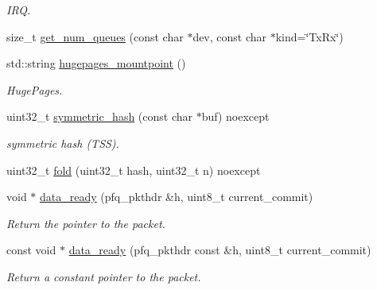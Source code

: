 \begin{DoxyCompactItemize}
\begin{DoxyCompactList}\small\item\em I\+R\+Q. \end{DoxyCompactList}\item 
size\+\_\+t \hyperlink{namespacepfq_a35dc28fdd850e9c82f1f3861cce2f9cb}{get\+\_\+num\+\_\+queues} (const char $\ast$dev, const char $\ast$kind=\char`\"{}Tx\+Rx\char`\"{})
\item 
std\+::string \hyperlink{namespacepfq_a46be800e747d99af1db9b92a8f296930}{hugepages\+\_\+mountpoint} ()
\begin{DoxyCompactList}\small\item\em Huge\+Pages. \end{DoxyCompactList}\item 
uint32\+\_\+t \hyperlink{namespacepfq_acd3646943e133a2651876f9ca0bd154c}{symmetric\+\_\+hash} (const char $\ast$buf) noexcept
\begin{DoxyCompactList}\small\item\em symmetric hash (T\+S\+S). \end{DoxyCompactList}\item 
uint32\+\_\+t \hyperlink{namespacepfq_a881bd432d152026217ddbf0ae5d72833}{fold} (uint32\+\_\+t hash, uint32\+\_\+t n) noexcept
\item 
void $\ast$ \hyperlink{namespacepfq_a89313b8c7a729b4e37b751db8ea522f4}{data\+\_\+ready} (pfq\+\_\+pkthdr \&h, uint8\+\_\+t current\+\_\+commit)
\begin{DoxyCompactList}\small\item\em Return the pointer to the packet. \end{DoxyCompactList}\item 
const void $\ast$ \hyperlink{namespacepfq_a50ce09535c2c899fe6b3c069681b4cae}{data\+\_\+ready} (pfq\+\_\+pkthdr const \&h, uint8\+\_\+t current\+\_\+commit)
\begin{DoxyCompactList}\small\item\em Return a constant pointer to the packet. \end{DoxyCompactList}\end{DoxyCompactItemize}


